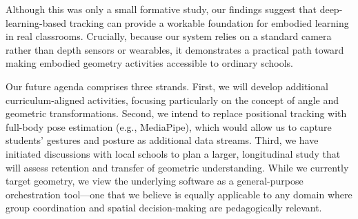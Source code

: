 Although this was only a small formative study, our findings suggest
that deep-learning-based tracking can provide a workable foundation for
embodied learning in real classrooms. Crucially, because our system
relies on a standard camera rather than depth sensors or wearables, it
demonstrates a practical path toward making embodied geometry activities
accessible to ordinary schools.

Our future agenda comprises three strands. First, we will develop
additional curriculum-aligned activities, focusing particularly on the
concept of angle and geometric transformations. Second, we intend to
replace positional tracking with full-body pose estimation (e.g.,
MediaPipe), which would allow us to capture students' gestures and
posture as additional data streams. Third, we have initiated discussions
with local schools to plan a larger, longitudinal study that will assess
retention and transfer of geometric understanding. While we currently
target geometry, we view the underlying software as a general-purpose
orchestration tool---one that we believe is equally applicable to any
domain where group coordination and spatial decision-making are
pedagogically relevant.

